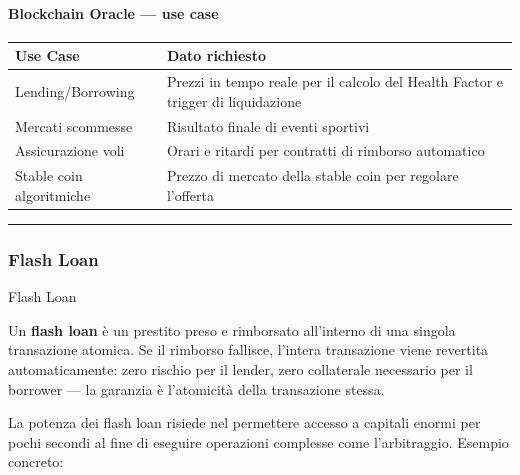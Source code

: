 \documentclass[
  italian,
  openany]{book}
\newcounter{none} %
\begin{document}
\paragraph{Blockchain Oracle --- use
case}\label{blockchain-oracle-use-case}

{\def\LTcaptype{none} %
\begin{longtable}[]{@{}
  >{\raggedright\arraybackslash}p{}
  >{\raggedright\arraybackslash}p{}@{}}
\toprule\noalign{}
\begin{minipage}[b]{\linewidth}\raggedright
Use Case
\end{minipage} & \begin{minipage}[b]{\linewidth}\raggedright
Dato richiesto
\end{minipage} \\
\midrule\noalign{}
\endhead
\bottomrule\noalign{}
\endlastfoot
Lending/Borrowing & Prezzi in tempo reale per il calcolo del Health
Factor e trigger di liquidazione \\
Mercati scommesse & Risultato finale di eventi sportivi \\
Assicurazione voli & Orari e ritardi per contratti di rimborso
automatico \\
Stable coin algoritmiche & Prezzo di mercato della stable coin per
regolare l'offerta \\
\end{longtable}
}

\begin{center}\rule{0.5\linewidth}{0.5pt}\end{center}

\subsubsection{Flash Loan}\label{flash-loan}

\begin{calloutdefinition}{Flash Loan}

Un \textbf{flash loan} è un prestito preso e rimborsato all'interno di
una singola transazione atomica. Se il rimborso fallisce, l'intera
transazione viene revertita automaticamente: zero rischio per il lender,
zero collaterale necessario per il borrower --- la garanzia è
l'atomicità della transazione stessa.

\end{calloutdefinition}

La potenza dei flash loan risiede nel permettere accesso a capitali
enormi per pochi secondi al fine di eseguire operazioni complesse come
l'arbitraggio. Esempio concreto:
\end{document}
